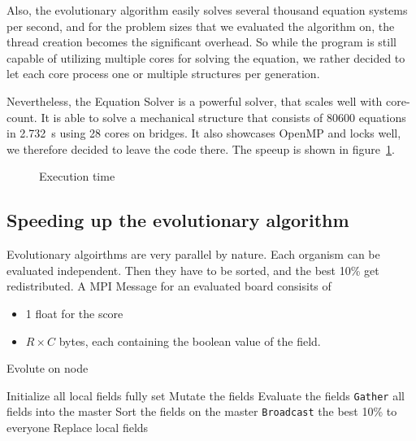 \documentclass[12pt]{article}
\begin{document}
Also, the evolutionary algorithm easily solves several thousand equation systems per second, and for the problem sizes that we evaluated the algorithm on, the thread creation becomes the significant overhead. So while the program is still capable of utilizing multiple cores for solving the equation, we rather decided to let each core process one or multiple structures per generation.

Nevertheless, the Equation Solver is a powerful solver, that scales well with core-count. It is able to solve a mechanical structure that consists of 80600 equations in \SI{2.732}{\second} using 28 cores on bridges. It also showcases OpenMP and locks well, we therefore decided to leave the code there. The speeup is shown in figure~\ref{fig:Speedup}.

\begin{figure}[t]
    \centering
    
    \caption{Execution time}
    \label{fig:Speedup}
\end{figure}

\subsection{Speeding up the evolutionary algorithm}

Evolutionary algoirthms are very parallel by nature. Each organism can be evaluated independent. Then they have to be sorted, and the best 10\% get redistributed. A MPI Message for an evaluated board consisits of

\begin{itemize}
    \item 1 float for the score
    \item $R \times C$ bytes, each containing the boolean value of the field.
\end{itemize}

\begin{algorithm}[t]
    \caption{Evolute on node}
    \begin{algorithmic}
        \STATE Initialize all local fields fully set
            \STATE Mutate the fields
            \STATE Evaluate the fields
            \STATE \texttt{Gather} all fields into the master
            \STATE Sort the fields on the master
            \STATE \texttt{Broadcast} the best 10\% to everyone
            \STATE Replace local fields
        \ENDFOR
    \end{algorithmic}
    \label{alg:Evolution}
\end{algorithm}
\end{document}
